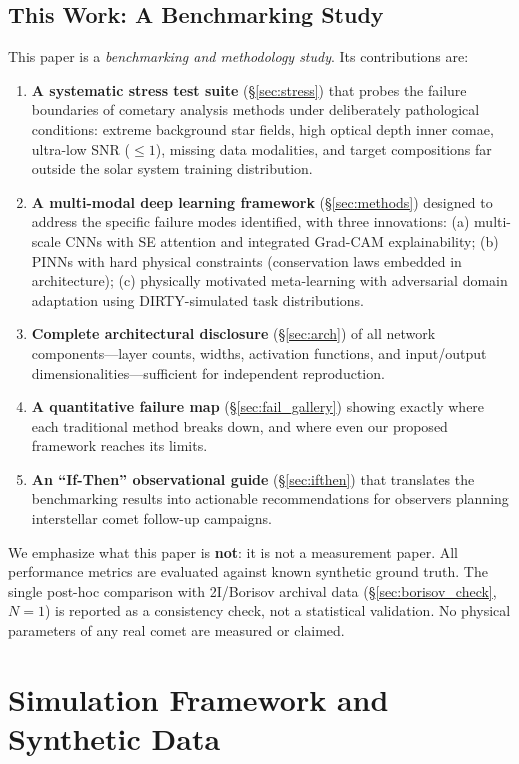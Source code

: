 \documentclass[preprint2]{aastex631}
\begin{document}
\subsection{This Work: A Benchmarking Study}

This paper is a \textit{benchmarking and methodology study}. Its contributions are:

\begin{enumerate}
    \item \textbf{A systematic stress test suite} (\S\ref{sec:stress}) that probes the failure boundaries of cometary analysis methods under deliberately pathological conditions: extreme background star fields, high optical depth inner comae, ultra-low SNR ($\leq 1$), missing data modalities, and target compositions far outside the solar system training distribution.
    \item \textbf{A multi-modal deep learning framework} (\S\ref{sec:methods}) designed to address the specific failure modes identified, with three innovations: (a) multi-scale CNNs with SE attention and integrated Grad-CAM explainability; (b) PINNs with hard physical constraints (conservation laws embedded in architecture); (c) physically motivated meta-learning with adversarial domain adaptation using DIRTY-simulated task distributions.
    \item \textbf{Complete architectural disclosure} (\S\ref{sec:arch}) of all network components---layer counts, widths, activation functions, and input/output dimensionalities---sufficient for independent reproduction.
    \item \textbf{A quantitative failure map} (\S\ref{sec:fail_gallery}) showing exactly where each traditional method breaks down, and where even our proposed framework reaches its limits.
    \item \textbf{An ``If-Then'' observational guide} (\S\ref{sec:ifthen}) that translates the benchmarking results into actionable recommendations for observers planning interstellar comet follow-up campaigns.
\end{enumerate}

We emphasize what this paper is \textbf{not}: it is not a measurement paper. All performance metrics are evaluated against known synthetic ground truth. The single post-hoc comparison with 2I/Borisov archival data (\S\ref{sec:borisov_check}, $N=1$) is reported as a consistency check, not a statistical validation. No physical parameters of any real comet are measured or claimed.

\section{Simulation Framework and Synthetic Data}\label{sec:simulation}
\end{document}
